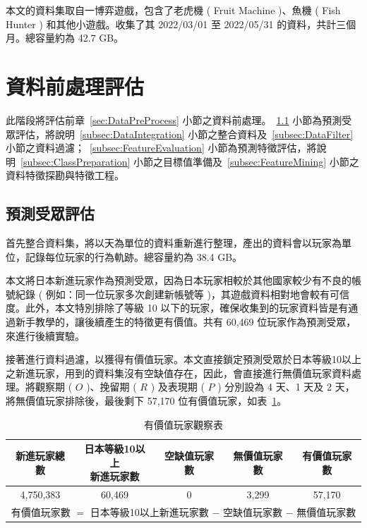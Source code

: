 本文的資料集取自一博弈遊戲，包含了老虎機 ( Fruit Machine )、魚機 ( Fish Hunter ) 和其他小遊戲。收集了其 2022/03/01 至 2022/05/31 的資料，共計三個月。總容量約為 42.7 GB。
\newpage

\section{資料前處理評估}
\label{sec:DataPreprocessEvaluation}

此階段將評估前章~\ref{sec:DataPreProcess} 小節之資料前處理。~\ref{subsec:AudienceEvaluation} 小節為預測受眾評估，將說明~\ref{subsec:DataIntegration} 小節之整合資料及~\ref{subsec:DataFilter} 小節之資料過濾；~\ref{subsec:FeatureEvaluation} 小節為預測特徵評估，將說明~\ref{subsec:ClassPreparation} 小節之目標值準備及~\ref{subsec:FeatureMining} 小節之資料特徵探勘與特徵工程。

\subsection{預測受眾評估}
\label{subsec:AudienceEvaluation}

首先整合資料集，將以天為單位的資料重新進行整理，產出的資料會以玩家為單位，記錄每位玩家的行為軌跡。總容量約為 38.4 GB。

本文將日本新進玩家作為預測受眾，因為日本玩家相較於其他國家較少有不良的帳號紀錄 ( 例如：同一位玩家多次創建新帳號等 )，其遊戲資料相對地會較有可信度。此外，本文特別排除了等級 10 以下的玩家，確保收集到的玩家資料皆是有通過新手教學的，讓後續產生的特徵更有價值。共有 60,469 位玩家作為預測受眾，來進行後續實驗。

接著進行資料過濾，以獲得有價值玩家。本文直接鎖定預測受眾於日本等級10以上之新進玩家，用到的資料集沒有空缺值存在，因此，會直接進行無價值玩家資料處理。將觀察期 ( $O$ )、挽留期 ( $R$ ) 及表現期 ( $P$ ) 分別設為 4 天、1 天及 2 天，將無價值玩家排除後，最後剩下 57,170 位有價值玩家，如表~\ref{tab:ValuePlayerObservation}。

\begin{table}[!htb]
	\centering
	\begin{tabular}{ccccc}
	\hline \hline
	新進玩家總數 & \tabincell{c}{日本等級10以上\\新進玩家數} & 空缺值玩家數 & 無價值玩家數 & 有價值玩家數 \\
    \hline \hline
    4,750,383 & 60,469 & 0 & 3,299 & 57,170 \\
    \hline
    \multicolumn{5}{c}{有價值玩家數 $=$ 日本等級10以上新進玩家數 $-$ 空缺值玩家數 $-$ 無價值玩家數} \\
    \hline \hline
	\end{tabular}
	\caption[有價值玩家觀察表]{有價值玩家觀察表}
	\label{tab:ValuePlayerObservation}
\end{table}
\newpage

